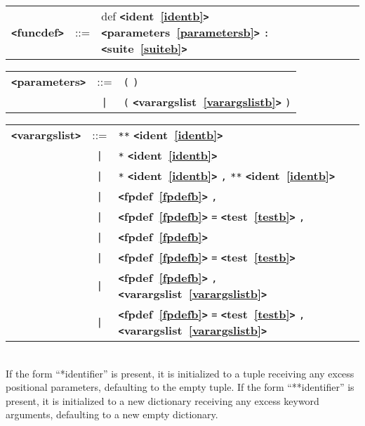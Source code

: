 \documentclass[12pt]{article}
\begin{document}
\begin{tabular}{lcl}
{\bf \verb+<+funcdef\verb+>+} & ::=  & def {\bf \verb+<+ident~\ref{identb}\verb+>+}  {\bf \verb+<+parameters~\ref{parametersb}\verb+>+}  \verb|:| {\bf \verb+<+suite~\ref{suiteb}\verb+>+}  \\
\end{tabular}

\label{parametersb}
\begin{tabular}{lcl}
{\bf \verb+<+parameters\verb+>+} & ::=  & \verb|(| \verb|)| \\
 & \verb+|+  & \verb|(| {\bf \verb+<+varargslist~\ref{varargslistb}\verb+>+}  \verb|)| \\
\end{tabular}

\label{varargslistb}
\begin{tabular}{lcl}
{\bf \verb+<+varargslist\verb+>+} & ::=  & \verb|**| {\bf \verb+<+ident~\ref{identb}\verb+>+}  \\
 & \verb+|+  & \verb|*| {\bf \verb+<+ident~\ref{identb}\verb+>+}  \\
 & \verb+|+  & \verb|*| {\bf \verb+<+ident~\ref{identb}\verb+>+}  \verb|,| \verb|**| {\bf \verb+<+ident~\ref{identb}\verb+>+}  \\
 & \verb+|+  & {\bf \verb+<+fpdef~\ref{fpdefb}\verb+>+}  \verb|,| \\
 & \verb+|+  & {\bf \verb+<+fpdef~\ref{fpdefb}\verb+>+}  \verb|=| {\bf \verb+<+test~\ref{testb}\verb+>+}  \verb|,| \\
 & \verb+|+  & {\bf \verb+<+fpdef~\ref{fpdefb}\verb+>+}  \\
 & \verb+|+  & {\bf \verb+<+fpdef~\ref{fpdefb}\verb+>+}  \verb|=| {\bf \verb+<+test~\ref{testb}\verb+>+}  \\
 & \verb+|+  & {\bf \verb+<+fpdef~\ref{fpdefb}\verb+>+}  \verb|,| {\bf \verb+<+varargslist~\ref{varargslistb}\verb+>+}  \\
 & \verb+|+  & {\bf \verb+<+fpdef~\ref{fpdefb}\verb+>+}  \verb|=| {\bf \verb+<+test~\ref{testb}\verb+>+}  \verb|,| {\bf \verb+<+varargslist~\ref{varargslistb}\verb+>+}  \\
\end{tabular} \\

If the form ``*identifier'' is present, it is initialized to a tuple receiving 
any excess positional parameters, defaulting to the empty tuple. 
If the form ``**identifier'' is present, it is initialized to a new dictionary 
receiving any excess keyword arguments, defaulting to a new empty dictionary.
\end{document}
